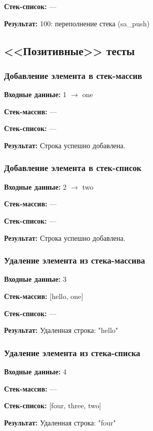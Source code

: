 \documentclass[a4paper,12pt]{extarticle}
\begin{document}
\textbf{Стек-список: }
---

\textbf{Результат: }
100: переполнение стека (sa\_push)


\subsection{<<Позитивные>> тесты}

\subsubsection{Добавление элемента в стек-массив}

\textbf{Входные данные: }
1 $\rightarrow$ one

\textbf{Стек-массив: }
---

\textbf{Стек-список: }
---

\textbf{Результат: }
Строка успешно добавлена.

\subsubsection{Добавление элемента в стек-список}

\textbf{Входные данные: }
2 $\rightarrow$ two

\textbf{Стек-массив: }
---

\textbf{Стек-список: }
---

\textbf{Результат: }
Строка успешно добавлена.

\subsubsection{Удаление элемента из стека-массива}

\textbf{Входные данные: }
3

\textbf{Стек-массив: }
[hello, one]

\textbf{Стек-список: }
---

\textbf{Результат: }
Удаленная строка: "hello"

\subsubsection{Удаление элемента из стека-списка}

\textbf{Входные данные: }
4

\textbf{Стек-массив: }
---

\textbf{Стек-список: }
[four, three, two]

\textbf{Результат: }
Удаленная строка: "four"
\end{document}
